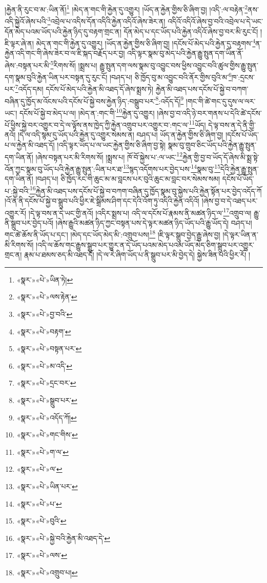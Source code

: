 །རྐྱེན་ནི་རུང་བ་མ་:ཡིན་ནོ།\footnote{«སྣར་»«པེ་»ཡིན་ཏེ།} །མེད་ན་གང་གི་རྐྱེན་དུ་འགྱུར། །ཡོད་ན་རྐྱེན་གྱིས་ཅི་ཞིག་བྱ། །འདི་:ལ་བརྟེན་\footnote{«སྣར་»«པེ་»ལས་རྟེན་}ནས་འདི་སྐྱེའོ་ཞེས་པའི་\footnote{«སྣར་»«པེ་»བྱ་བའི་}འབྲེལ་པ་འདིས་དོན་འདིའི་རྐྱེན་འདིའོ་ཞེས་ཟེར་ན། འདིའོ་འདིའོ་ཞེས་བྱ་བའི་འབྲེལ་པ་དེ་ཡང་དོན་མེད་པའམ་ཡོད་པའི་རྐྱེན་ཉིད་དུ་བརྟག་གྲང་ན། དོན་མེད་པ་དང་ཡོད་པའི་རྐྱེན་འདིའོ་ཞེས་བྱ་བར་མི་རུང་ངོ། །ཇི་ལྟར་ཞེ་ན། མེད་ན་གང་གི་རྐྱེན་དུ་འགྱུར། །ཡོད་ན་རྐྱེན་གྱིས་ཅི་ཞིག་བྱ། །དངོས་པོ་མེད་པའི་རྐྱེན་དུ་བརྟགས་\footnote{«སྣར་»«པེ་»བརྟག་}ན་རྐྱེན་འདི་གང་གི་ཞེས་ཟེར་བ་ལ་ཇི་སྐད་བརྗོད་པར་བྱ། འདི་ལྟར་སྣམ་བུ་མེད་པའི་རྐྱེན་རྒྱུ་སྤུན་དག་ཡིན་ནོ་ཞེས་:བསྟན་པར་མི་\footnote{«སྣར་»«པེ་»བསྟན་པར་}རིགས་སོ། །སྨྲས་པ། རྒྱུ་སྤུན་དག་ལས་སྣམ་བུ་འབྱུང་བས་ཕྱིས་འབྱུང་བའི་ཚུལ་གྱིས་རྒྱུ་སྤུན་དག་སྣམ་བུའི་རྐྱེན་ཡིན་པར་བསྟན་དུ་རུང་ངོ། །བཤད་པ། ཅི་ཁྱོད་བུ་མ་འབྱུང་བའི་ནོར་གྱིས་བུའི་མ་\footnote{«སྣར་»«པེ་»མ་འདི་}ཁ་:དྲངས་པར་\footnote{«སྣར་»«པེ་»དྲང་བར་}འདོད་དམ། དངོས་པོ་མེད་པའི་རྐྱེན་མི་འཐད་དོ་ཞེས་སྨྲས་ཏེ། རྐྱེན་མི་འཐད་པས་དངོས་པོ་སྐྱེ་བ་བཀག་བཞིན་དུ་ཁྱོད་མ་འོངས་པའི་དངོས་པོ་སྐྱེ་བས་རྐྱེན་ཉིད་:བསྒྲུབ་པར་\footnote{«སྣར་»«པེ་»སྒྲུབ་པར་}:འདོད་དོ།\footnote{«སྣར་»«པེ་»འདོད་ཀོ།} །གང་གི་ཚེ་གང་དུ་དུས་ལ་ལར་ཡང་། དངོས་པོ་སྐྱེ་བ་མེད་པ་ལ། །མེད་ན་:གང་གི་\footnote{«སྣར་»«པེ་»གང་གིས་}རྐྱེན་དུ་འགྱུར། །ཞེས་བྱ་བ་འདི་ཉེ་བར་གནས་པ་དེའི་ཚེ་དངོས་པོ་ཕྱིས་སྐྱེ་བར་འགྱུར་བ་དེ་ལ་ལྟོས་ནས་ཁྱེད་ཀྱི་རྐྱེན་འགྲུབ་པར་འགྱུར་བ་:གང་ལ་\footnote{«སྣར་»«པེ་»ག་ལ་}ཡོད། དེ་ལྟ་བས་ན་དེ་ནི་གྱི་ནའོ། །དེ་ལ་འདི་སྙམ་དུ་ཡོད་པའི་རྐྱེན་དུ་འགྱུར་སེམས་ན། བཤད་པ། ཡོད་ན་རྐྱེན་གྱིས་ཅི་ཞིག་བྱ། །དངོས་པོ་ཡོད་པ་ལ་རྐྱེན་མི་འཐད་དོ། །འདི་ལྟར་ཡོད་པ་ལ་ཡང་རྐྱེན་གྱིས་ཅི་ཞིག་བྱ་སྟེ། སྣམ་བུ་གྲུབ་ཅིང་ཡོད་པའི་རྐྱེན་རྒྱུ་སྤུན་དག་ཡིན་ནོ། །ཞེས་བསྟན་པར་མི་རིགས་སོ། །སྨྲས་པ། ཁོ་བོ་སྐྱེས་པ་:ལ་ཡང་\footnote{«སྣར་»«པེ་»ལ་}རྐྱེན་གྱི་བྱ་བ་ཡོད་དོ་ཞེས་མི་སྨྲ་སྟེ་འོན་ཀྱང་སྣམ་བུ་ཡོད་པའི་རྐྱེན་རྒྱུ་སྤུན་:ཡིན་པར་ཐ་\footnote{«སྣར་»«པེ་»ཡིན་པར་}སྙད་འདོགས་པར་བྱེད་པས་\footnote{«སྣར་»«པེ་»པ་}སྣམ་བུ་\footnote{«སྣར་»«པེ་»བུའི་}དེའི་རྐྱེན་རྒྱུ་སྤུན་དག་ཡིན་ནོ། །བཤད་པ། ཅི་ཁྱོད་རང་གི་ཆུང་མ་མ་བླངས་པར་བུའི་ཆུང་མ་བླང་བར་སེམས་སམ། དངོས་པོ་ཡོད་པ་:སྐྱེ་བའི་\footnote{«སྣར་»«པེ་»སྐྱེ་བའི་རྐྱེན་མི་འཐད་དེ་}རྐྱེན་མི་འཐད་པས་དངོས་པོ་སྐྱེ་བ་བཀག་བཞིན་དུ་ཁྱོད་སྣམ་བུ་སྐྱེས་པའི་རྐྱེན་སྟོན་པར་བྱེད་འདོད་ཀོ །འོ་ན་ནི་དངོས་པོ་སྐྱེ་བ་སྒྲུབ་པའི་ཕྱིར་ཇེ་སྒྲིམས་ཤིག་དང་དེའི་འོག་ཏུ་འདིའི་རྐྱེན་འདིའོ། །ཞེས་བྱ་བ་དེ་འཐད་པར་འགྱུར་རོ། །དེ་ལྟ་བས་ན་དེ་ཡང་གྱི་ནའོ། །འདིར་སྨྲས་པ། འདི་ལ་དངོས་པོ་རྣམས་ནི་མཚན་ཉིད་ལ་\footnote{«སྣར་»«པེ་»ལས་}འགྲུབ་ལ། རྒྱུ་ནི་སྒྲུབ་པར་བྱེད་པའོ། །ཞེས་རྒྱུའི་མཚན་ཉིད་ཀྱང་བསྟན་པས་དེ་ལྟར་མཚན་ཉིད་ཡོད་པའི་རྒྱུ་ཡོད་དེ། བཤད་པ། གང་ཚེ་ཆོས་ནི་ཡོད་པ་དང་། །མེད་དང་ཡོད་མེད་མི་:འགྲུབ་པས།\footnote{«སྣར་»«པེ་»འགྲུབ་པ།} །ཇི་ལྟར་སྒྲུབ་བྱེད་རྒྱུ་ཞེས་བྱ། །དེ་ལྟར་ཡིན་ན་མི་རིགས་སོ། །འདི་ལ་ཆོས་གང་རྒྱུས་སྒྲུབ་པར་གྱུར་ན་དེ་ཡོད་པའམ་མེད་པའམ་ཡོད་མེད་ཅིག་སྒྲུབ་པར་འགྱུར་གྲང་ན། རྣམ་པ་ཐམས་ཅད་མི་འཐད་དོ། །དེ་ལ་རེ་ཞིག་ཡོད་པ་ནི་སྒྲུབ་པར་མི་བྱེད་དེ། སྐྱེས་ཟིན་པའི་ཕྱིར་རོ། །
